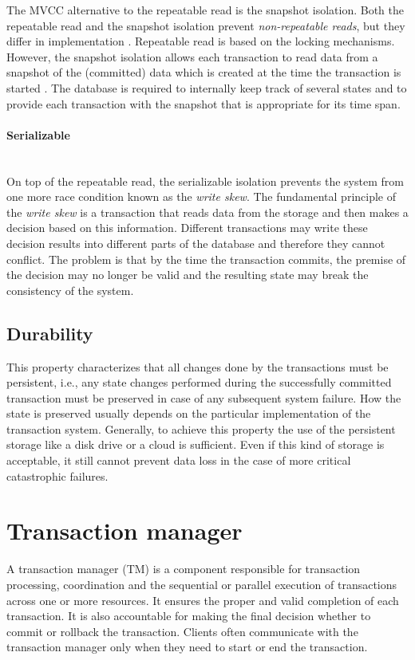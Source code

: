 \documentclass[oneside,
  digital, %
  table,   %
  lof,     %
  lot,     %
]{fithesis3}
\newcommand{\newlinepar}[1]{\paragraph{#1}\needspace{3\baselineskip}\mbox{}\\}
\begin{document}
The MVCC alternative to the repeatable read is the snapshot isolation. Both the repeatable read and the snapshot isolation prevent \textit{non-repeatable reads}, but they differ in implementation \cite{isolation_levels}. Repeatable read is based on the locking mechanisms. However, the snapshot isolation allows each transaction to read data from a snapshot of the (committed) data which is created at the time the transaction is started \cite{ansi-sql-critique}. The database is required to internally keep track of several states and to provide each transaction with the snapshot that is appropriate for its time span.

\newlinepar{Serializable}

On top of the repeatable read, the serializable isolation prevents the system from one more race condition known as the \textit{write skew}. The fundamental principle of the \textit{write skew} is a transaction that reads data from the storage and then makes a decision based on this information. Different transactions may write these decision results into different parts of the database and therefore they cannot conflict. The problem is that by the time the transaction commits, the premise of the decision may no longer be valid and the resulting state may break the consistency of the system.

\subsection{Durability}

This property characterizes that all changes done by the transactions must be persistent, i.e., any state changes performed during the successfully committed transaction must be preserved in case of any subsequent system failure. How the state is preserved usually depends on the particular implementation of the transaction system. Generally, to achieve this property the use of the persistent storage like a disk drive or a cloud is sufficient. Even if this kind of storage is acceptable, it still cannot prevent data loss in the case of more critical catastrophic failures.


\section{Transaction manager}
\label{sec:transaction-manager}

A transaction manager (TM) is a component responsible for transaction processing, coordination and the sequential or parallel execution of transactions across one or more resources. It ensures the proper and valid completion of each transaction. It is also accountable for making the final decision whether to commit or rollback the transaction. Clients often communicate with the transaction manager only when they need to start or end the transaction.
\end{document}

